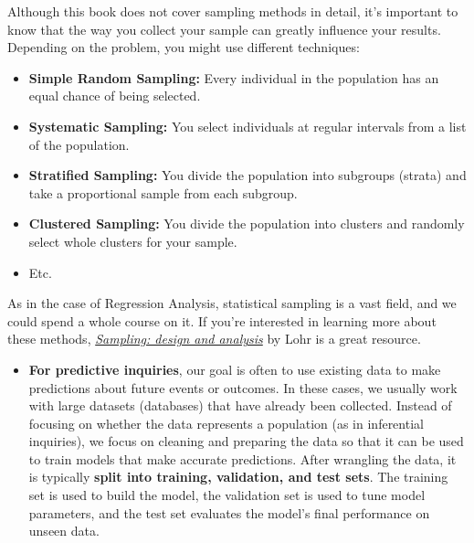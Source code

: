 \documentclass[
  letterpaper,
  DIV=11,
  numbers=noendperiod]{scrreprt}
\providecommand{\tightlist}{%
  \setlength{\itemsep}{0pt}\setlength{\parskip}{0pt}}\usepackage{longtable,booktabs,array}
\newcounter{quartocallouttipno}
\newcommand{\quartocallouttip}[1]{\refstepcounter{quartocallouttipno}\label{#1}}
\begin{document}
\begin{tcolorbox}[enhanced jigsaw, bottomrule=.15mm, breakable, colback=white, leftrule=.75mm, coltitle=black, rightrule=.15mm, bottomtitle=1mm, title=\textcolor{quarto-callout-tip-color}{\faLightbulb}\hspace{0.5em}{Tip \ref*{tip-sampling}: A Quick Debrief on Sampling!}, opacitybacktitle=0.6, toprule=.15mm, titlerule=0mm, arc=.35mm, colbacktitle=quarto-callout-tip-color!10!white, toptitle=1mm, colframe=quarto-callout-tip-color-frame, left=2mm, opacityback=0]

\quartocallouttip{tip-sampling} 

Although this book does not cover sampling methods in detail, it's
important to know that the way you collect your sample can greatly
influence your results. Depending on the problem, you might use
different techniques:

\begin{itemize}
\tightlist
\item
  \textbf{Simple Random Sampling:} Every individual in the population
  has an equal chance of being selected.
\item
  \textbf{Systematic Sampling:} You select individuals at regular
  intervals from a list of the population.
\item
  \textbf{Stratified Sampling:} You divide the population into subgroups
  (strata) and take a proportional sample from each subgroup.
\item
  \textbf{Clustered Sampling:} You divide the population into clusters
  and randomly select whole clusters for your sample.
\item
  Etc.
\end{itemize}

As in the case of Regression Analysis, statistical sampling is a vast
field, and we could spend a whole course on it. If you're interested in
learning more about these methods,
\href{https://webcat.library.ubc.ca/vwebv/holdingsInfo?bibId=2206157}{\emph{Sampling:
design and analysis}} by Lohr is a great resource.

\end{tcolorbox}

\begin{itemize}
\tightlist
\item
  \textbf{For predictive inquiries}, our goal is often to use existing
  data to make predictions about future events or outcomes. In these
  cases, we usually work with large datasets (databases) that have
  already been collected. Instead of focusing on whether the data
  represents a population (as in inferential inquiries), we focus on
  cleaning and preparing the data so that it can be used to train models
  that make accurate predictions. After wrangling the data, it is
  typically \textbf{split into training, validation, and test sets}. The
  training set is used to build the model, the validation set is used to
  tune model parameters, and the test set evaluates the model's final
  performance on unseen data.
\end{itemize}
\end{document}
